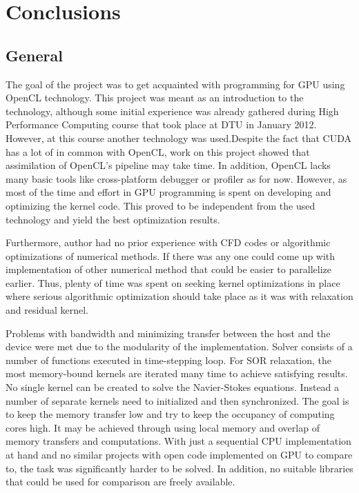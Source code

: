 \chapter{Conclusions}
\section{General}
The goal of the project was to get acquainted with programming for GPU using OpenCL technology. This project was meant as an introduction to the technology, although some initial experience was already gathered during High Performance Computing course that took place at DTU in January 2012. However, at this course another technology was used.Despite the fact that CUDA has a lot of in common with OpenCL, work on this project showed that assimilation of OpenCL's pipeline may take time. In addition, OpenCL lacks many basic tools like cross-platform debugger or profiler as for now. However, as most of the time and effort in GPU programming is spent on developing and optimizing the kernel code. This proved to be independent from the used technology and yield the best optimization results.

Furthermore, author had no prior experience with CFD codes or algorithmic optimizations of numerical methods. If there was any one could come up with implementation of other numerical method that could be easier to parallelize earlier. Thus, plenty of time was spent on seeking kernel optimizations in place where serious algorithmic optimization should take place as it was with relaxation and residual kernel.

Problems with bandwidth and minimizing transfer between the host and the device were met due to the modularity of the implementation. Solver consists of a number of functions executed in time-stepping loop. For SOR relaxation, the most memory-bound kernels are iterated many time to achieve satisfying results. No single kernel can be created to solve the Navier-Stokes equations. Instead a number of separate kernels need to initialized and then synchronized. The goal is to keep the memory transfer low and try to keep the occupancy of computing cores high. It may be achieved through using local memory and overlap of memory transfers and computations. With just a sequential CPU implementation at hand and no similar projects with open code implemented on GPU to compare to, the task was significantly harder to be solved. In addition, no suitable libraries that could be used for comparison are freely available.

